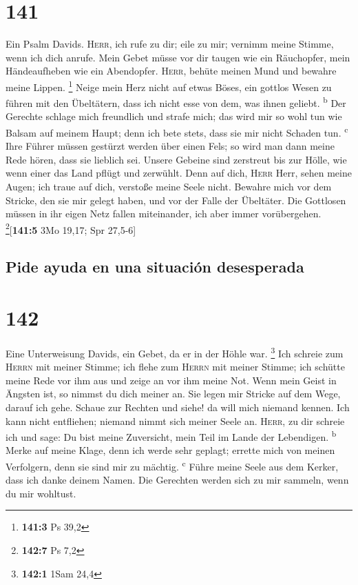 \hypertarget{section-140}{%
\section{141}\label{section-140}}

 Ein Psalm Davids. \textsc{Herr}, ich rufe zu dir; eile zu
mir; vernimm meine Stimme, wenn ich dich anrufe.  Mein
Gebet müsse vor dir taugen wie ein Räuchopfer, mein Händeaufheben wie
ein Abendopfer.  \textsc{Herr}, behüte meinen Mund und
bewahre meine Lippen. \footnote{\textbf{141:3} Ps 39,2} 
Neige mein Herz nicht auf etwas Böses, ein gottlos Wesen zu führen mit
den Übeltätern, dass ich nicht esse von dem, was ihnen geliebt.
\textsuperscript{b}  Der Gerechte schlage mich freundlich
und strafe mich; das wird mir so wohl tun wie Balsam auf meinem Haupt;
denn ich bete stets, dass sie mir nicht Schaden tun. \textsuperscript{c}
 Ihre Führer müssen gestürzt werden über einen Fels; so
wird man dann meine Rede hören, dass sie lieblich sei. 
Unsere Gebeine sind zerstreut bis zur Hölle, wie wenn einer das Land
pflügt und zerwühlt.  Denn auf dich, \textsc{Herr} Herr,
sehen meine Augen; ich traue auf dich, verstoße meine Seele nicht.
 Bewahre mich vor dem Stricke, den sie mir gelegt haben,
und vor der Falle der Übeltäter.  Die Gottlosen müssen in
ihr eigen Netz fallen miteinander, ich aber immer vorübergehen.
\footnote{\textbf{142:7} Ps 7,2}{[}\textbf{141:5} 3Mo 19,17; Spr
27,5-6{]}

\hypertarget{pide-ayuda-en-una-situaciuxf3n-desesperada}{%
\subsection{Pide ayuda en una situación
desesperada}\label{pide-ayuda-en-una-situaciuxf3n-desesperada}}

\hypertarget{section-141}{%
\section{142}\label{section-141}}

 Eine Unterweisung Davids, ein Gebet, da er in der Höhle
war. \footnote{\textbf{142:1} 1Sam 24,4}  Ich schreie zum
\textsc{Herrn} mit meiner Stimme; ich flehe zum \textsc{Herrn} mit
meiner Stimme;  ich schütte meine Rede vor ihm aus und
zeige an vor ihm meine Not.  Wenn mein Geist in Ängsten
ist, so nimmst du dich meiner an. Sie legen mir Stricke auf dem Wege,
darauf ich gehe.  Schaue zur Rechten und siehe! da will
mich niemand kennen. Ich kann nicht entfliehen; niemand nimmt sich
meiner Seele an.  \textsc{Herr}, zu dir schreie ich und
sage: Du bist meine Zuversicht, mein Teil im Lande der Lebendigen.
\textsuperscript{b}  Merke auf meine Klage, denn ich werde
sehr geplagt; errette mich von meinen Verfolgern, denn sie sind mir zu
mächtig. \textsuperscript{c}  Führe meine Seele aus dem
Kerker, dass ich danke deinem Namen. Die Gerechten werden sich zu mir
sammeln, wenn du mir wohltust.

